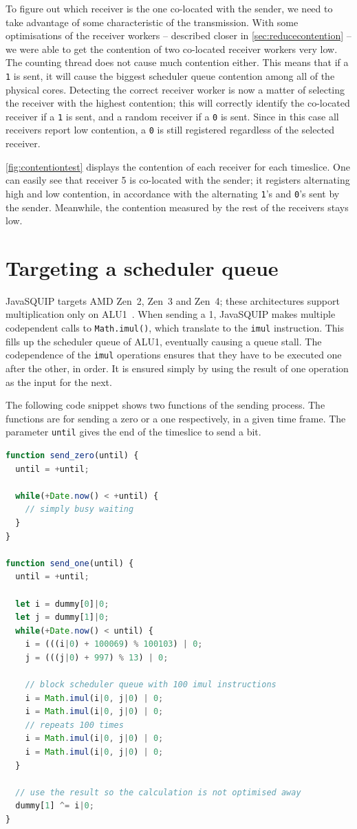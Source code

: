 \documentclass[11pt,
  titlepage=false,
]{scrreprt}
\begin{document}
To figure out which receiver is the one co-located with the sender,
we need to take advantage of some characteristic of the transmission.
With some optimisations of the receiver workers -- described closer in \ref{sec:reducecontention} --
we were able to get the contention of two co-located receiver workers very low.
The counting thread does not cause much contention either.
This means that if a \texttt{1} is sent, it will cause the biggest scheduler queue contention among all of the physical cores.
Detecting the correct receiver worker is now a matter of selecting the receiver with the highest contention;
this will correctly identify the co-located receiver if a \texttt{1} is sent, and a random receiver if a \texttt{0} is sent.
Since in this case all receivers report low contention, a \texttt{0} is still registered regardless of the selected receiver.

\ref{fig:contentiontest} displays the contention of each receiver for each timeslice.
One can easily see that receiver 5 is co-located with the sender;
it registers alternating high and low contention, in accordance with the alternating \texttt{1}'s and \texttt{0}'s sent by the sender.
Meanwhile, the contention measured by the rest of the receivers stays low.

\section{Targeting a scheduler queue}
JavaSQUIP targets AMD Zen~2, Zen~3 and Zen~4;
these architectures support multiplication only on ALU1~\cite{AMD2020OptimizationEPYC7003}.
When sending a 1, JavaSQUIP makes multiple codependent calls to \texttt{Math.imul()}, which translate to the \texttt{imul} instruction.
This fills up the scheduler queue of ALU1, eventually causing a queue stall.
The codependence of the \texttt{imul} operations ensures that they have to be executed one after the other, in order.
It is ensured simply by using the result of one operation as the input for the next.

The following code snippet shows two functions of the sending process.
The functions are for sending a zero or a one respectively, in a given time frame.
The parameter \texttt{until} gives the end of the timeslice to send a bit.
\begin{lstlisting}[language=JavaScript]
function send_zero(until) {
  until = +until;

  while(+Date.now() < +until) {
    // simply busy waiting
  }
}

function send_one(until) {
  until = +until;

  let i = dummy[0]|0;
  let j = dummy[1]|0;
  while(+Date.now() < until) {
    i = (((i|0) + 100069) % 100103) | 0;
    j = (((j|0) + 997) % 13) | 0;

    // block scheduler queue with 100 imul instructions
    i = Math.imul(i|0, j|0) | 0;
    i = Math.imul(i|0, j|0) | 0;
    // repeats 100 times
    i = Math.imul(i|0, j|0) | 0;
    i = Math.imul(i|0, j|0) | 0;
  }

  // use the result so the calculation is not optimised away
  dummy[1] ^= i|0;
}
\end{lstlisting}
\end{document}
